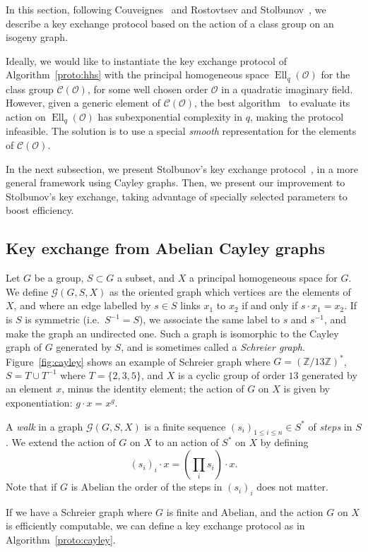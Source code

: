 \documentclass{article}
\newcommand{\Cl}{\mathcal{C}}
\newcommand{\Graph}{\mathcal{G}}
\renewcommand{\O}{\mathcal{O}}
\theoremstyle{definition}
\DeclareMathOperator{\Ell}{Ell}
\begin{document}
In this section, following Couveignes~\cite{cryptoeprint:2006:291} and
Rostovtsev and Stolbunov~\cite{rostovtsev+stolbunov06}, we describe a
key exchange protocol based on the action of a class group on an
isogeny graph.

Ideally, we would like to instantiate the key exchange protocol of
Algorithm~\ref{proto:hhs} with the principal homogeneous space
$\Ell_q(\O)$ for the class group $\Cl(\O)$, for some well chosen order
$\O$ in a quadratic imaginary field. However, given a generic element
of $\Cl(\O)$, the best algorithm~\cite{jao+soukharev10} to evaluate
its action on $\Ell_q(\O)$ has subexponential complexity in $q$,
making the protocol infeasible. The solution is to use a special
\emph{smooth} representation for the elements of $\Cl(\O)$.

In the next subsection, we present Stolbunov's key exchange
protocol~\cite{Stol}, in a more general framework using Cayley graphs.
Then, we present our improvement to Stolbunov's key exchange, taking
advantage of specially selected parameters to boost efficiency.


\subsection{Key exchange from Abelian Cayley graphs}

Let $G$ be a group, $S⊂G$ a subset, and $X$ a principal homogeneous
space for $G$. We define $\Graph(G, S, X)$ as the oriented graph which
vertices are the elements of $X$, and where an edge labelled by $s∈S$
links $x_1$ to $x_2$ if and only if $s\cdot x_1 = x_2$.  If is $S$ is
symmetric (i.e.\ $S^{-1}=S$), we associate the same label to $s$ and
$s^{-1}$, and make the graph an undirected one. Such a graph is
isomorphic to the Cayley graph of $G$ generated by $S$, and is
sometimes called a \emph{Schreier graph}.  Figure~\ref{fig:cayley}
shows an example of Schreier graph where $G=(ℤ/13ℤ)^*$, $S=T∪T^{-1}$
where $T=\{2,3,5\}$, and $X$ is a cyclic group of order $13$ generated
by an element $x$, minus the identity element; the action of $G$ on
$X$ is given by exponentiation: $g·x=x^g$.

A \emph{walk} in a graph $\Graph(G,S,X)$ is a finite sequence
$(s_i)_{1≤i≤n}∈S^*$ of \emph{steps} in $S$. We extend the action of
$G$ on $X$ to an action of $S^*$ on $X$ by defining
\[(s_i)_i·x = \left(\prod_i s_i\right)·x.\] %
Note that if $G$ is Abelian the order of the steps in $(s_i)_i$ does
not matter.

If we have a Schreier graph where $G$ is finite and Abelian, and the
action $G$ on $X$ is efficiently computable, we can define a key
exchange protocol as in Algorithm~\ref{proto:cayley}.
\end{document}
